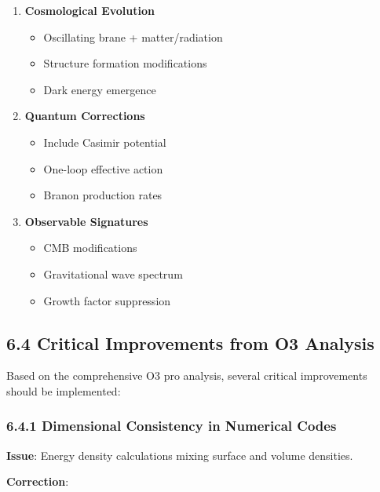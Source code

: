 \documentclass[
  11pt,
]{report}
\providecommand{\tightlist}{%
  \setlength{\itemsep}{0pt}\setlength{\parskip}{0pt}}
\begin{document}
\begin{enumerate}
\def\labelenumi{\arabic{enumi}.}
\tightlist
\item
  \textbf{Cosmological Evolution}

  \begin{itemize}
  \tightlist
  \item
    Oscillating brane + matter/radiation
  \item
    Structure formation modifications
  \item
    Dark energy emergence
  \end{itemize}
\item
  \textbf{Quantum Corrections}

  \begin{itemize}
  \tightlist
  \item
    Include Casimir potential
  \item
    One-loop effective action
  \item
    Branon production rates
  \end{itemize}
\item
  \textbf{Observable Signatures}

  \begin{itemize}
  \tightlist
  \item
    CMB modifications
  \item
    Gravitational wave spectrum
  \item
    Growth factor suppression
  \end{itemize}
\end{enumerate}

\subsection{6.4 Critical Improvements from O3
Analysis}\label{critical-improvements-from-o3-analysis}

Based on the comprehensive O3 pro analysis, several critical
improvements should be implemented:

\subsubsection{6.4.1 Dimensional Consistency in Numerical
Codes}\label{dimensional-consistency-in-numerical-codes}

\textbf{Issue}: Energy density calculations mixing surface and volume
densities.

\textbf{Correction}:
\end{document}
